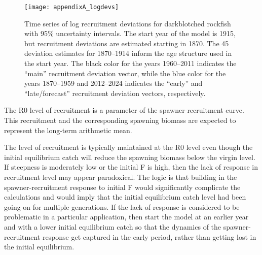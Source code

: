 \begin{figure}[H]
	\begin{center}
		\texttt{[image: appendixA\_logdevs]}\\
	\end{center}
	\caption{Time series of log recruitment deviations for darkblotched rockfish with 95\% uncertainty intervals. The start year of the model is 1915, but recruitment deviations are estimated starting in 1870. The 45 deviation estimates for 1870--1914 inform the age structure used in the start year. The black color for the years 1960--2011 indicates the ``main'' recruitment deviation vector, while the blue color for the years 1870--1959 and 2012--2024 indicates the ``early'' and ``late/forecast'' recruitment deviation vectors, respectively.}
	\label{fig:recdevs}
\end{figure}

The R0 level of recruitment is a parameter of the spawner-recruitment curve. This recruitment and the corresponding spawning biomass are expected to represent the long-term arithmetic mean.

The level of recruitment is typically maintained at the R0 level even though the initial equilibrium catch will reduce the spawning biomass below the virgin level. If steepness is moderately low or the initial F is high, then the lack of response in recruitment level may appear paradoxical. The logic is that building in the spawner-recruitment response to initial F would significantly complicate the calculations and would imply that the initial equilibrium catch level had been going on for multiple generations. If the lack of response is considered to be problematic in a particular application, then start the model at an earlier year and with a lower initial equilibrium catch so that the dynamics of the spawner-recruitment response get captured in the early period, rather than getting lost in the initial equilibrium.

